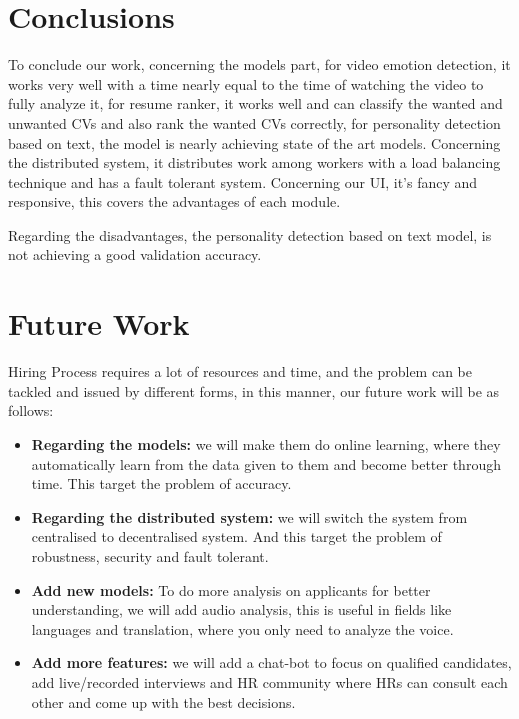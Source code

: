 \section{Conclusions}

To conclude our work, concerning the models part, for video emotion detection, it works very well with a time nearly equal to the time of watching the video to fully analyze it, for resume ranker, it works well and can classify the wanted and unwanted CVs and also rank the wanted CVs correctly, for personality detection based on text, the model is nearly achieving state of the art models. Concerning the distributed system, it distributes work among workers with a load balancing technique and has a fault tolerant system. Concerning our UI, it's fancy and responsive, this covers the advantages of each module.

Regarding the disadvantages, the personality detection based on text model, is not achieving a good validation accuracy.

\section{Future Work}


Hiring Process requires a lot of resources and time, and the problem can be tackled and issued by different forms, in this manner, our future work will be as follows:
\begin{itemize}
    \item \textbf{Regarding the models: }we will make them do online learning, where they automatically learn from the data given to them and become better through time. This target the problem of accuracy.
    
    \item \textbf{Regarding the distributed system: } we will switch the system from centralised to decentralised system. And this target the problem of robustness, security and fault tolerant.
    
    \item \textbf{Add new models: }  To do more analysis on applicants for better understanding, we will add audio analysis, this is useful in fields like languages and translation, where you only need to analyze the voice.
    
    
    \item \textbf{Add more features: }  we will add a chat-bot to focus on qualified candidates, add live/recorded interviews and HR community where HRs can consult each other and come up with the best decisions.
\end{itemize}





